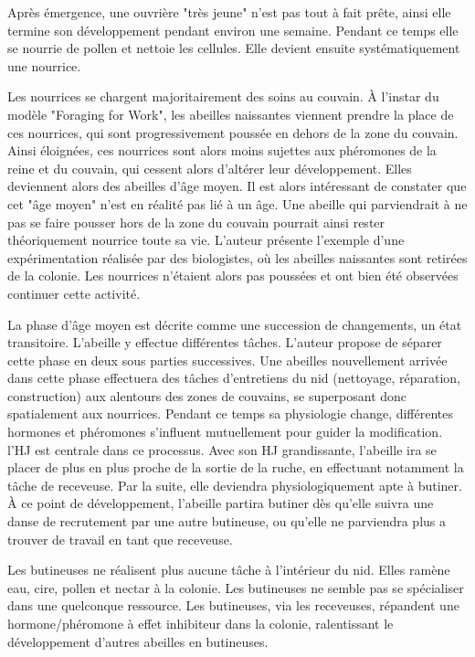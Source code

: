        Après émergence, une ouvrière "très jeune" n'est pas tout à fait prête, ainsi elle termine son développement pendant environ une semaine. Pendant ce temps elle se nourrie de pollen et nettoie les cellules. Elle devient ensuite systématiquement une nourrice. 
        
        Les nourrices se chargent majoritairement des soins au couvain. À l'instar du modèle "Foraging for Work", les abeilles naissantes viennent prendre la place de ces nourrices, qui sont progressivement poussée en dehors de la zone du couvain. Ainsi éloignées, ces nourrices sont alors moins sujettes aux phéromones de la reine et du couvain, qui cessent alors d'altérer leur développement. Elles deviennent alors des abeilles d'âge moyen. Il est alors intéressant de constater que cet "âge moyen" n'est en réalité pas lié à un âge. Une abeille qui parviendrait à ne pas se faire pousser hors de la zone du couvain pourrait ainsi rester théoriquement nourrice toute sa vie. L'auteur présente l'exemple d'une expérimentation réalisée par des biologistes, où les abeilles naissantes sont retirées de la colonie. Les nourrices n'étaient alors pas poussées et ont bien été observées continuer cette activité.
        
        La phase d'âge moyen est décrite comme une succession de changements, un état transitoire. L'abeille y effectue différentes tâches. L'auteur propose de séparer cette phase en deux sous parties successives. Une abeilles nouvellement arrivée dans cette phase effectuera des tâches d'entretiens du nid (nettoyage, réparation, construction) aux alentours des zones de couvains, se superposant donc spatialement aux nourrices. Pendant ce temps sa physiologie change, différentes hormones et phéromones s'influent mutuellement pour guider la modification. l'HJ est centrale dans ce processus. Avec son HJ grandissante, l'abeille ira se placer de plus en plus proche de la sortie de la ruche, en effectuant notamment la tâche de receveuse. Par la suite, elle deviendra physiologiquement apte à butiner. À ce point de développement, l'abeille partira butiner dès qu'elle suivra une danse de recrutement par une autre butineuse, ou qu'elle ne parviendra plus a trouver de travail en tant que receveuse.
        
        Les butineuses ne réalisent plus aucune tâche à l'intérieur du nid. Elles ramène eau, cire, pollen et nectar à la colonie. Les butineuses ne semble pas se spécialiser dans une quelconque ressource. Les butineuses, via les receveuses, répandent une hormone/phéromone à effet inhibiteur dans la colonie, ralentissant le développement d'autres abeilles en butineuses.
        
